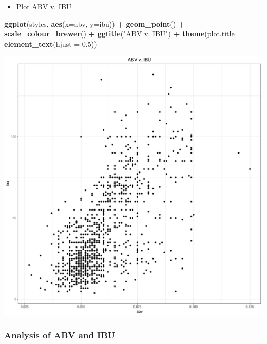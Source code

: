 \documentclass[]{article}
\newenvironment{Shaded}{\begin{snugshade}}{\end{snugshade}}
\newcommand{\KeywordTok}[1]{\textcolor[rgb]{0.13,0.29,0.53}{\textbf{#1}}}
\newcommand{\DataTypeTok}[1]{\textcolor[rgb]{0.13,0.29,0.53}{#1}}
\newcommand{\FloatTok}[1]{\textcolor[rgb]{0.00,0.00,0.81}{#1}}
\newcommand{\StringTok}[1]{\textcolor[rgb]{0.31,0.60,0.02}{#1}}
\newcommand{\OperatorTok}[1]{\textcolor[rgb]{0.81,0.36,0.00}{\textbf{#1}}}
\newcommand{\NormalTok}[1]{#1}
\providecommand{\tightlist}{%
  \setlength{\itemsep}{0pt}\setlength{\parskip}{0pt}}
\begin{document}
\begin{itemize}
\tightlist
\item
  Plot ABV v. IBU
\end{itemize}

\begin{Shaded}
\begin{Highlighting}[]
\KeywordTok{ggplot}\NormalTok{(styles, }\KeywordTok{aes}\NormalTok{(}\DataTypeTok{x=}\NormalTok{abv, }\DataTypeTok{y=}\NormalTok{ibu)) }\OperatorTok{+}
\StringTok{  }\KeywordTok{geom_point}\NormalTok{() }\OperatorTok{+}
\StringTok{  }\KeywordTok{scale_colour_brewer}\NormalTok{() }\OperatorTok{+}
\StringTok{  }\KeywordTok{ggtitle}\NormalTok{(}\StringTok{"ABV v. IBU"}\NormalTok{) }\OperatorTok{+}
\StringTok{  }\KeywordTok{theme}\NormalTok{(}\DataTypeTok{plot.title =} \KeywordTok{element_text}\NormalTok{(}\DataTypeTok{hjust =} \FloatTok{0.5}\NormalTok{))}
\end{Highlighting}
\end{Shaded}

\begin{center}\includegraphics{Analysis_Final_files/figure-latex/unnamed-chunk-21-1} \end{center}

\subsubsection{Analysis of ABV and IBU}\label{analysis-of-abv-and-ibu}
\end{document}
